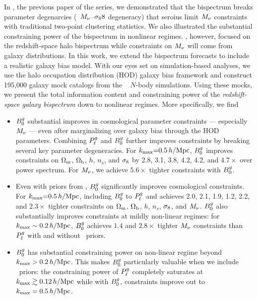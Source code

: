 In \cite{hahn2020}, the previous paper of the series, we demonstrated that the 
bispectrum breaks parameter degenarcies (\eg~$M_\nu$--$\sigma_88$ degeneracy) that 
seroius limit $M_\nu$ constraints with traditional two-point clustering statistics. 
We also illustrated the substantial constraining power of the bispectrum in nonlinear regimes.
\cite{hahn2020}, however, focused on the redshift-space halo bispectrum while 
constraints on $M_\nu$ will come from galaxy distributions. %
In this work, we extend the \cite{hahn2020} bispectrum forecasts to
include a realistic galaxy bias model. With our eyes set on
simulation-based analyses, we use the halo occupation distribution (HOD) galaxy
bias framework and construct 195,000 galaxy mock catalogs from the \quij~
$N$-body simulations. Using these mocks, we present the total information
content and constraining power of the {\em redshift-space galaxy bispectrum} 
down to nonlinear regimes. More specifically, we find
\begin{itemize}
    \item $B^g_0$ substantial improves in cosmological parameter constraints ---
    especially $M_\nu$ --- even after marginalizing over galaxy bias through
    the HOD parameters. Combining $P^g_{\ell}$ and $B^g_0$ further improves
    constraints by breaking several key parameter degeneracies. For 
    $k_{\rm max}{=}0.5\,h/\mathrm{Mpc}$, $B^g_0$ improves constraints on 
    $\Omega_{\rm m}$, $\Omega_{\rm b}$, $h$, $n_s$, and $\sigma_8$ by 2.8, 3.1, 3.8, 4.2, 4.2, and 
    $4.7{\times}$ over power spectrum. For $M_\nu$, we achieve $5.6\times$ 
    tighter constraints with $B^g_0$.

    \item Even with priors from \planck, $B^g_0$ significantly improves
    cosmological constraints. For $k_{\rm max}{=}0.5\,h/\mathrm{Mpc}$, including $B^g_0$ to $P^g_{\ell}$
    and \planck achieves 2.0, 2.1, 1.9, 1.2, 2.2, and $2.3\times$ tighter 
    constraints on $\Omega_{\rm m}$, $\Omega_{\rm b}$, $h$, $n_s$, $\sigma_8$, and $M_\nu$. $B^g_0$ also
    substantially improves constraints at mildly non-linear regimes:
    for $k_{\rm max}\sim0.2\,h/\mathrm{Mpc}$, $B^g_0$ achieves $1.4$ and $2.8\times$ tighter
    $M_\nu$ constraints than $P^g_{\ell}$ with and without \planck~priors. 

    \item $B^g_0$ has substantial constraining power on non-linear regime beyond
    $k_{\rm max} > 0.2\,h/\mathrm{Mpc}$. This makes $B^g_0$ particularly valuable when we include
    \planck~priors: the constraining power of $P^g_{\ell}$ completely saturates 
    at $k_{\rm max} \gtrsim 0.12\,h/\mathrm{Mpc}$ while with $B^g_0$, constraints improve out to 
    $k_{\rm max}=0.5\,h/\mathrm{Mpc}$. 
\end{itemize}

